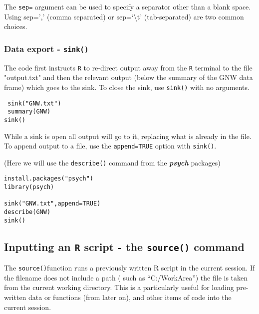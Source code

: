 \documentclass[a4paper,12pt]{article}
\begin{document}


The  \texttt{sep=} argument can be used to specify a separator other than a blank space. Using sep=',' (comma separated) or sep=`\textbackslash t' (tab-separated) are two common choices.



\subsubsection{Data export - \texttt{sink()}}


The code first instructs \texttt{R} to re-direct output away from the \texttt{R} terminal to the file "output.txt" and
then the relevant output  (below the summary of the GNW data frame) which goes to the sink.
To close the sink, use
\texttt{sink()} with no arguments.

\begin{framed}
\begin{verbatim}
 sink("GNW.txt")
 summary(GNW)
sink()
\end{verbatim}
\end{framed}


While a sink is open all output will go to it, replacing what is already in the file. To append output
to a file, use the \texttt{append=TRUE} option with \texttt{sink()}. 

(Here we will use the \texttt{describe()} command from the \textbf{\textit{psych}} packages)

\begin{framed}
\begin{verbatim}
install.packages("psych")
library(psych)
 
sink("GNW.txt",append=TRUE)
describe(GNW)
sink()
\end{verbatim}
\end{framed}

\subsection{Inputting an \texttt{R} script - the \texttt{source()} command}
The \texttt{source()}function runs a previously written R script in the current session. If the filename does not include a path ( such as “C:/WorkArea”) the file is taken from the current working directory. This is a particularly useful for loading pre-written data or functions  (from  later on), and other items of code into the current session.
\end{document}
